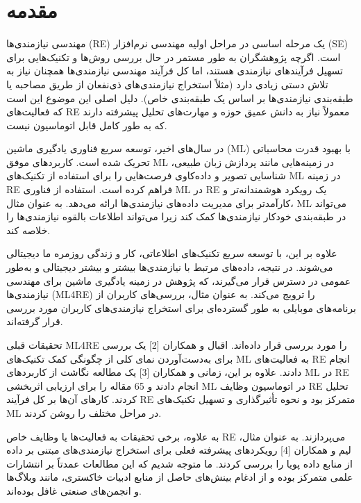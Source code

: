 \documentclass[a4paper,10pt]{article}
\begin{document}
    \section{مقدمه}

    مهندسی نیازمندی‌ها (RE) یک مرحله اساسی در مراحل اولیه مهندسی نرم‌افزار (SE) است. اگرچه پژوهشگران به طور مستمر در حال بررسی روش‌ها و تکنیک‌هایی برای تسهیل فرآیندهای نیازمندی هستند، اما کل فرآیند مهندسی نیازمندی‌ها همچنان نیاز به تلاش دستی زیادی دارد (مثلاً استخراج نیازمندی‌های ذی‌نفعان از طریق مصاحبه یا طبقه‌بندی نیازمندی‌ها بر اساس یک طبقه‌بندی خاص). دلیل اصلی این موضوع این است که فعالیت‌های RE معمولاً نیاز به دانش عمیق حوزه و مهارت‌های تحلیل پیشرفته دارند که به طور کامل قابل اتوماسیون نیست.

    در سال‌های اخیر، توسعه سریع فناوری یادگیری ماشین (ML) با بهبود قدرت محاسباتی تحریک شده است. کاربردهای موفق ML در زمینه‌هایی مانند پردازش زبان طبیعی، شناسایی تصویر و داده‌کاوی فرصت‌هایی را برای استفاده از تکنیک‌های ML در زمینه RE فراهم کرده است. استفاده از فناوری ML در RE یک رویکرد هوشمندانه‌تر و کارآمدتر برای مدیریت داده‌های نیازمندی‌ها ارائه می‌دهد. به عنوان مثال، ML می‌تواند در طبقه‌بندی خودکار نیازمندی‌ها کمک کند زیرا می‌تواند اطلاعات بالقوه نیازمندی‌ها را خلاصه کند.

    علاوه بر این، با توسعه سریع تکنیک‌های اطلاعاتی، کار و زندگی روزمره ما دیجیتالی می‌شوند. در نتیجه، داده‌های مرتبط با نیازمندی‌ها بیشتر و بیشتر دیجیتالی و به‌طور عمومی در دسترس قرار می‌گیرند، که پژوهش در زمینه یادگیری ماشین برای مهندسی نیازمندی‌ها (ML4RE) را ترویج می‌کند. به عنوان مثال، بررسی‌های کاربران از برنامه‌های موبایلی به طور گسترده‌ای برای استخراج نیازمندی‌های کاربران مورد بررسی قرار گرفته‌اند.

    تحقیقات قبلی ML4RE را مورد بررسی قرار داده‌اند. اقبال و همکاران [2] یک بررسی برای به‌دست‌آوردن نمای کلی از چگونگی کمک تکنیک‌های ML به فعالیت‌های RE انجام دادند. علاوه بر این، زمانی و همکاران [3] یک مطالعه نگاشت از کاربردهای ML در RE انجام دادند و 65 مقاله را برای ارزیابی اثربخشی ML در اتوماسیون وظایف RE تحلیل کردند. کارهای آن‌ها بر کل فرآیند RE متمرکز بود و نحوه تأثیرگذاری و تسهیل تکنیک‌های ML در مراحل مختلف را روشن کردند.

    به علاوه، برخی تحقیقات به فعالیت‌ها یا وظایف خاص RE می‌پردازند. به عنوان مثال، لیم و همکاران [4] رویکردهای پیشرفته فعلی برای استخراج نیازمندی‌های مبتنی بر داده از منابع داده پویا را بررسی کردند. ما متوجه شدیم که این مطالعات عمدتاً بر انتشارات علمی متمرکز بوده و از ادغام بینش‌های حاصل از منابع ادبیات خاکستری، مانند وبلاگ‌ها و انجمن‌های صنعتی غافل بوده‌اند.
\end{document}
